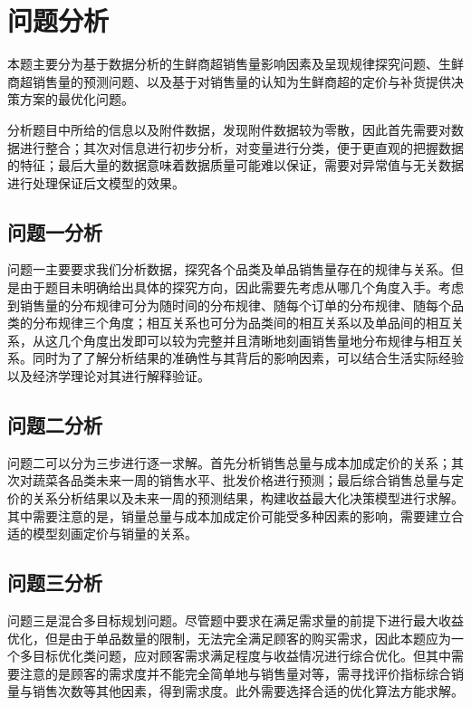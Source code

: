\documentclass[withoutpreface,bwprint]{cumcmthesis} %
\begin{document}
\section{问题分析}

本题主要分为基于数据分析的生鲜商超销售量影响因素及呈现规律探究问题、生鲜商超销售量的预测问题、以及基于对销售量的认知为生鲜商超的定价与补货提供决策方案的最优化问题。

分析题目中所给的信息以及附件数据，发现附件数据较为零散，因此首先需要对数据进行整合；其次对信息进行初步分析，对变量进行分类，便于更直观的把握数据的特征；最后大量的数据意味着数据质量可能难以保证，需要对异常值与无关数据进行处理保证后文模型的效果。

\subsection{问题一分析}

问题一主要要求我们分析数据，探究各个品类及单品销售量存在的规律与关系。但是由于题目未明确给出具体的探究方向，因此需要先考虑从哪几个角度入手。考虑到销售量的分布规律可分为随时间的分布规律、随每个订单的分布规律、随每个品类的分布规律三个角度；相互关系也可分为品类间的相互关系以及单品间的相互关系，从这几个角度出发即可以较为完整并且清晰地刻画销售量地分布规律与相互关系。同时为了了解分析结果的准确性与其背后的影响因素，可以结合生活实际经验以及经济学理论对其进行解释验证。


\subsection{问题二分析}
问题二可以分为三步进行逐一求解。首先分析销售总量与成本加成定价的关系；其次对蔬菜各品类未来一周的销售水平、批发价格进行预测；最后综合销售总量与定价的关系分析结果以及未来一周的预测结果，构建收益最大化决策模型进行求解。其中需要注意的是，销量总量与成本加成定价可能受多种因素的影响，需要建立合适的模型刻画定价与销量的关系。

\subsection{问题三分析}
问题三是混合多目标规划问题。尽管题中要求在满足需求量的前提下进行最大收益优化，但是由于单品数量的限制，无法完全满足顾客的购买需求，因此本题应为一个多目标优化类问题，应对顾客需求满足程度与收益情况进行综合优化。但其中需要注意的是顾客的需求度并不能完全简单地与销售量对等，需寻找评价指标综合销量与销售次数等其他因素，得到需求度。此外需要选择合适的优化算法方能求解。
\end{document}
